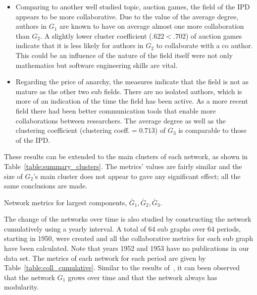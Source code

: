 \documentclass{article}
\theoremstyle{definition}
\begin{document}
\begin{itemize}
    \item Comparing to another well studied topic, auction games, the field of the
    IPD appears to be more collaborative. Due to the
    value of the average degree, authors in \(G_1\) are known to have on average almost
    one more collaboration than \(G_2\). A slightly lower cluster coefficient ($ .622 < .702$)
    of auction games indicate that it is less likely for authors in \(G_2\) to collaborate
    with a co author. This could be an influence of the nature of the field itself
    were not only mathematics but software engineering skills are vital.
    \item Regarding the price of anarchy, the measures indicate that the field
    is not as mature as the other two sub fields. There are no isolated authors,
    which is more of an indication of the time the field has been active. As a
    more recent field there had been better communication tools that enable more
    collaborations between researchers. The average degree as well as the clustering
    coefficient (clustering coeff.$=0.713$) of \(G_3\) is comparable to those
    of the IPD.
\end{itemize}

These results can be extended to the main clusters of each network, as shown in
Table~\ref{table:summary_clusters}. The metrics' values are fairly similar and
the size of \(G_2\)'s main cluster does not appear to gave any significant
effect; all the same conclusions are made.

\begin{table}[!hbtp]
    \centering
    \resizebox{\textwidth}{!}{
    }
    \caption{Network metrics for largest components, \(\bar{G}_1, \bar{G}_2, \bar{G}_3\).}\label{table:summary_clusters}
\end{table}

The change of the networks over time is also studied by constructing the network
cumulatively using a yearly interval. A total of 64 sub graphs
over 64 periods, starting in 1950, were created and all the collaborative metrics
for each sub graph have been calculated. Note that years 1952 and 1953 have no
publications in our data set. The metrics of each network for each period are given by
Table~\ref{table:coll_cumulative}.
Similar to the results of~\cite{Liu2015}, it can been observed that the network \(G_1\)
grows over time and that the network always has modularity.

\begin{table}[!hbtp]
    \centering
    \begin{adjustbox}{totalheight=.8\baselineskip, width=\textwidth}
    }
    \caption{Collaborativeness metrics for cumulative graphs, \(G \subseteq G_1\).}\label{table:coll_cumulative}
\end{adjustbox}
\end{table}
\end{document}
